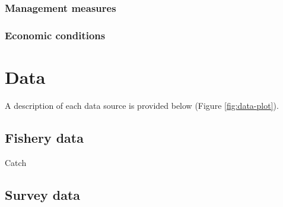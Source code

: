 \documentclass[11pt,
  english,
  a4paper,
]{article}
\begin{document}
\leavevmode\tagmcend\tagstructend


\hypertarget{management-measures}{%
\subsubsection{Management measures}\label{management-measures}}

\leavevmode\tagmcend\tagstructend


\hypertarget{economic-conditions}{%
\subsubsection{Economic conditions}\label{economic-conditions}}

\leavevmode\tagmcend\tagstructend


\hypertarget{data}{%
\section{Data}\label{data}}

\leavevmode\tagmcend\tagstructend


A description of each data source is provided below (Figure \ref{fig:data-plot}).

\leavevmode\tagmcend\tagstructend\par


\hypertarget{fishery-data}{%
\subsection{Fishery data}\label{fishery-data}}

\leavevmode\tagmcend\tagstructend


Catch

\leavevmode\tagmcend\tagstructend\par


\hypertarget{survey-data}{%
\subsection{Survey data}\label{survey-data}}
\end{document}
